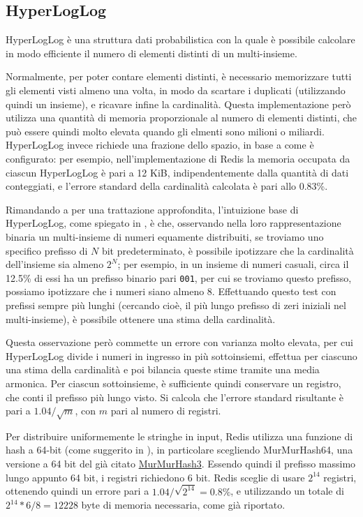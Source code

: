 \subsection{HyperLogLog}

HyperLogLog \cite{hyperloglog} è una struttura dati probabilistica con la quale è possibile
calcolare in modo efficiente il numero di elementi distinti di un multi-insieme. 

Normalmente, per poter contare elementi distinti, è necessario memorizzare tutti gli elementi visti
almeno una volta, in modo da scartare i duplicati (utilizzando quindi un insieme), e ricavare infine
la cardinalità. Questa implementazione però utilizza una quantità di memoria proporzionale al numero
di elementi distinti, che può essere quindi molto elevata quando gli elmenti sono milioni o
miliardi. HyperLogLog invece richiede una frazione dello spazio, in base a come è configurato: per
esempio, nell'implementazione di Redis la memoria occupata da ciascun HyperLogLog è pari a 12 KiB,
indipendentemente dalla quantità di dati conteggiati, e l'errore standard della cardinalità
calcolata è pari allo 0.83\%.

Rimandando a \cite{hyperloglog} per una trattazione approfondita, l'intuizione base di HyperLogLog,
come spiegato in \cite{hyperloglog-explain}, è che, osservando nella loro
rappresentazione binaria un multi-insieme di numeri equamente distribuiti, se troviamo uno specifico
prefisso di $N$ bit predeterminato, è possibile ipotizzare che la cardinalità dell'insieme sia
almeno $2^N$; per esempio, in un insieme di numeri casuali, circa il 12.5\% di essi ha un prefisso
binario pari \verb|001|, per cui se troviamo questo prefisso, possiamo ipotizzare che i numeri siano
almeno 8. Effettuando questo test con prefissi sempre più lunghi (cercando cioè, il più lungo
prefisso di zeri iniziali nel multi-insieme), è possibile ottenere una stima della cardinalità.

Questa osservazione però commette un errore con varianza molto elevata, per cui HyperLogLog divide i
numeri in ingresso in più sottoinsiemi, effettua per ciascuno una stima della cardinalità e poi
bilancia queste stime tramite una media armonica. Per ciascun sottoinsieme, è sufficiente quindi
conservare un registro, che conti il prefisso più lungo visto. Si calcola che l'errore standard 
risultante è pari a $1.04 / \sqrt{m}$, con $m$ pari al numero di registri. 

Per distribuire uniformemente le stringhe in input, Redis utilizza una funzione di hash a 64-bit
(come suggerito in \cite{hyperloglog-plusplus}), in particolare scegliendo MurMurHash64, una
versione a 64 bit del già citato
\href{https://github.com/aappleby/smhasher/wiki/MurmurHash3}{MurMurHash3}. Essendo quindi il
prefisso massimo lungo appunto 64 bit, i registri richiedono 6 bit. Redis sceglie di usare $2^{14}$
registri, ottenendo quindi un errore pari a $1.04 / \sqrt{2^{14}} = 0.8\%$, e utilizzando un totale
di $2^{14} * 6 / 8 = 12228$ byte di memoria necessaria, come già riportato.

